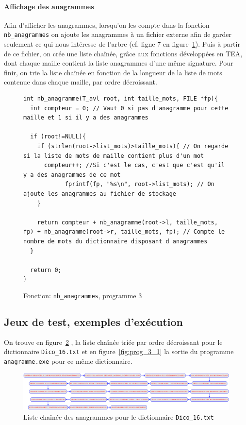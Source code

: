 \documentclass{article} %
\begin{document}
\paragraph{Affichage des anagrammes} Afin d'afficher les anagrammes, lorsqu'on les compte dans la fonction \texttt{nb\_anagrammes} on ajoute les anagrammes à un fichier externe afin de garder seulement ce qui nous intéresse de l'arbre (cf. ligne 7 en figure~\ref{fig:nb_anag}). Puis à partir de ce fichier, on crée une liste chaînée, grâce aux fonctions développées en TEA, dont chaque maille contient la liste anagrammes d'une même signature. Pour finir, on trie la liste chaînée en fonction de la longueur de la liste de mots contenue dans chaque maille, par ordre décroissant. 

\begin{figure}[H]
  \begin{lstlisting}
int nb_anagramme(T_avl root, int taille_mots, FILE *fp){
  int compteur = 0; // Vaut 0 si pas d'anagramme pour cette maille et 1 si il y a des anagrammes

  if (root!=NULL){
    if (strlen(root->list_mots)>taille_mots){ // On regarde si la liste de mots de maille contient plus d'un mot
      compteur++; //Si c'est le cas, c'est que c'est qu'il y a des anagrammes de ce mot
            fprintf(fp, "%s\n", root->list_mots); // On ajoute les anagrammes au fichier de stockage
    }

    return compteur + nb_anagramme(root->l, taille_mots, fp) + nb_anagramme(root->r, taille_mots, fp); // Compte le nombre de mots du dictionnaire disposant d anagrammes
  }

  return 0;
}\end{lstlisting}
\caption{Fonction: \texttt{nb\_anagrammes}, programme 3}
\label{fig:nb_anag}
  
\end{figure}

\subsection{Jeux de test, exemples d'exécution}

On trouve en figure~\ref{fig:prog_3_2} , la liste chaînée triée par ordre décroissant pour le dictionnaire \texttt{Dico\_16.txt} et en figure~\ref{fig:prog_3_1} la sortie du programme \texttt{anagramme.exe} pour ce même dictionnaire.

\begin{figure}[H]
  \begin{center}
    \includegraphics[scale=0.28]{Img_prog3/liste_chaine.eps}
  \end{center}
  \caption{Liste chaînée des anagrammes pour le dictionnaire \texttt{Dico\_16.txt}}
  \label{fig:prog_3_2}
\end{figure}
\end{document}
